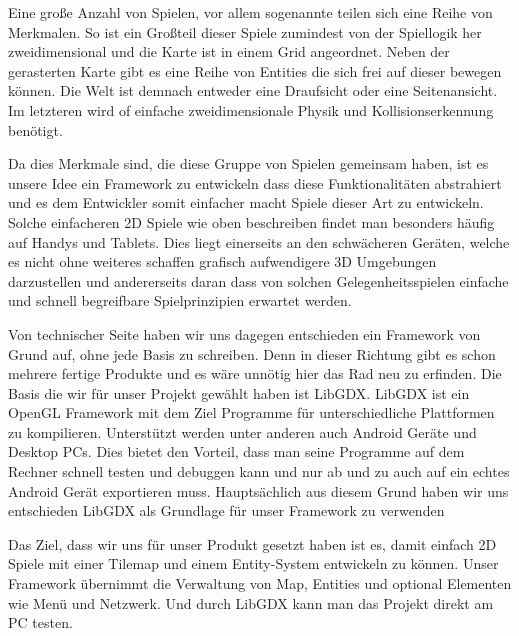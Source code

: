 Eine große Anzahl von Spielen, vor allem sogenannte  teilen sich eine Reihe von Merkmalen.
So ist ein Großteil dieser Spiele zumindest von der Spiellogik her zweidimensional und die Karte ist in einem Grid angeordnet. Neben der gerasterten Karte gibt es eine Reihe von Entities die sich frei auf dieser bewegen können. Die Welt ist demnach entweder eine Draufsicht oder eine Seitenansicht. Im letzteren wird of einfache zweidimensionale Physik und Kollisionserkennung benötigt.

Da dies Merkmale sind, die diese Gruppe von Spielen gemeinsam haben, ist es unsere Idee ein Framework zu entwickeln dass diese Funktionalitäten abstrahiert und es dem Entwickler somit einfacher macht Spiele dieser Art zu entwickeln.
Solche einfacheren 2D Spiele wie oben beschreiben findet man besonders häufig auf Handys und Tablets. Dies liegt einerseits an den schwächeren Geräten, welche es nicht ohne weiteres schaffen grafisch aufwendigere 3D Umgebungen darzustellen und andererseits daran dass von solchen Gelegenheitsspielen einfache und schnell begreifbare Spielprinzipien erwartet werden.

Von technischer Seite haben wir uns dagegen entschieden ein Framework von Grund auf, ohne jede Basis zu schreiben. Denn in dieser Richtung gibt es schon mehrere fertige Produkte und es wäre unnötig hier das Rad neu zu erfinden. 
Die Basis die wir für unser Projekt gewählt haben ist LibGDX. LibGDX ist ein OpenGL Framework mit dem Ziel Programme für unterschiedliche Plattformen zu kompilieren. Unterstützt werden unter anderen auch Android Geräte und Desktop PCs. Dies bietet den Vorteil, dass man seine Programme auf dem Rechner schnell testen und debuggen kann und nur ab und zu auch auf ein echtes Android Gerät exportieren muss. Hauptsächlich aus diesem Grund haben wir uns entschieden LibGDX als Grundlage für unser Framework zu verwenden

Das Ziel, dass wir uns für unser Produkt gesetzt haben ist es, damit einfach 2D Spiele mit einer Tilemap und einem Entity-System entwickeln zu können. Unser Framework übernimmt die Verwaltung von Map, Entities und optional Elementen wie Menü und Netzwerk. Und durch LibGDX kann man das Projekt direkt am PC testen.